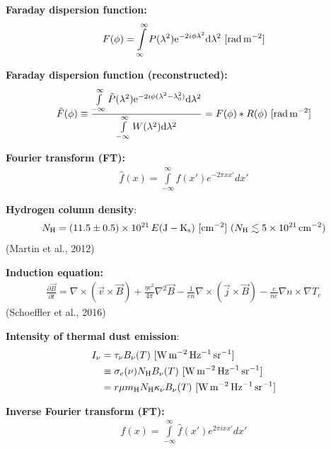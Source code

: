 \documentclass[a4paper,10pt]{article}
\begin{document}
{\noindent}\textbf{Faraday dispersion function:}
\begin{align*}
F(\phi) = \int\limits_{\infty}^\infty P(\lambda^2)\mathrm{e}^{-2i\phi\lambda^2}\mathrm{d}\lambda^2 ~ [{\rm rad\,m^{-2}}]
\end{align*}

{\noindent}\textbf{Faraday dispersion function (reconstructed):}
\begin{align*}
\tilde{F}(\phi) \equiv \dfrac{\int\limits_{-\infty}^\infty \tilde{P}(\lambda^2)\mathrm{e}^{-2i\phi(\lambda^2-\lambda_0^2)}\mathrm{d}\lambda^2}{\int\limits_{-\infty}^\infty W(\lambda^2)\mathrm{d}\lambda^2} = F(\phi) * R(\phi) ~ [{\rm rad\,m^{-2}}]
\end{align*}

{\noindent}\textbf{Fourier transform (FT):}
\begin{align*}
    \hat{f}(x) = \int\limits_{-\infty}^\infty f(x')e^{-2\pi xx'}dx'
\end{align*}

{\noindent}\textbf{Hydrogen column density}:
\begin{align*}
    N_{\rm H} = (11.5\pm0.5)\times10^{21}\,E({\rm J-K_s}) ~ [{\rm cm^{-2}}]~(N_{\rm H}\lesssim5\times10^{21}\,{\rm cm^{-2}})
\end{align*}
(Martin et al., 2012)

{\noindent}\textbf{Induction equation:}
\begin{align*}
    \frac{\partial\vec{B}}{\partial t} = \nabla\times(\vec{v}\times\vec{B}) + \frac{\eta c^2}{4\pi}\nabla^2\vec{B} - \frac{1}{en}\nabla\times(\vec{j}\times\vec{B}) - \frac{c}{ne}\nabla n\times\nabla T_e
\end{align*}
(Schoeffler et al., 2016)

{\noindent}\textbf{Intensity of thermal dust emission}:
\begin{align*}
    I_\nu &= \tau_\nu B_\nu(T) ~ [{\rm W\,m^{-2}\,Hz^{-1}\,sr^{-1}}] \\
             &\equiv \sigma_e(\nu)N_{\rm H}B_\nu(T) ~ [{\rm W\,m^{-2}\,Hz^{-1}\,sr^{-1}}] \\
             &= r\mu m_{\rm H}N_{\rm H}\kappa_\nu B_\nu(T) ~ [{\rm W\,m^{-2}\,Hz^{-1}\,sr^{-1}}]
\end{align*}

{\noindent}\textbf{Inverse Fourier transform (FT):}
\begin{align*}
    f(x) = \int\limits_{-\infty}^\infty \hat{f}(x')e^{2\pi ixx'}dx'
\end{align*}
\end{document}
